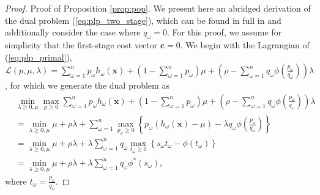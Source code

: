 \documentclass[opre,nonblindrev]{informs3} %
\newcommand{\x}{\mathbf{x}}
\renewcommand{\c}{\mathbf{c}}
\begin{document}
\begin{proof}{\sc Proof of Proposition \ref{prop:pop}.}
	We present here an abridged derivation of the dual problem (\ref{eq:plp_two_stage}), which can be found in full in \citep{bental2011robust} and additionally consider the case where $q_\omega = 0$.
	For this proof, we assume for simplicity that the first-stage cost vector $\c = 0$.	
	We begin with the Lagrangian of (\ref{eq:plp_primal}), $\mathcal{L}(p,\mu,\lambda) = \sum_{\omega=1}^n p_\omega h_\omega(\x) + \left( 1-\sum_{\omega=1}^n p_\omega \right)\mu + \left( \rho - \sum_{\omega=1}^n q_\omega \phi\left(\frac{p_\omega}{q_\omega}\right) \right)\lambda$, for which we generate the dual problem as
	\begin{align}
		 & \min_{\lambda \geq 0, \mu} \max_{p \geq 0} \sum_{\omega=1}^n p_\omega h_\omega(\x) + \left( 1-\sum_{\omega=1}^n p_\omega \right)\mu + \left( \rho - \sum_{\omega=1}^n q_\omega \phi\left(\frac{p_\omega}{q_\omega}\right) \right)\lambda \nonumber \\
		& = \min_{\lambda \geq 0, \mu} \mu + \rho\lambda + \sum_{\omega=1}^n \max_{p_\omega \geq 0} \left\{ p_\omega (h_\omega(\x) - \mu) - \lambda q_\omega \phi\left(\frac{p_\omega}{q_\omega}\right) \right\} \label{eq:pop_proof_detail_1} \\
		& =  \min_{\lambda \geq 0, \mu} \mu + \rho\lambda + \lambda \sum_{\omega=1}^n q_\omega \max_{t_\omega \geq 0} \left\{ s_\omega t_\omega - \phi(t_\omega) \right\} \label{eq:pop_proof_detail_2} \\
		& = \min_{\lambda \geq 0, \mu} \mu + \rho\lambda + \lambda \sum_{\omega=1}^n q_\omega \phi^*\left(s_\omega\right), \nonumber
	\end{align}
	where $t_\omega = \frac{p_\omega}{q_\omega}$.
	

\end{proof}
\end{document}
